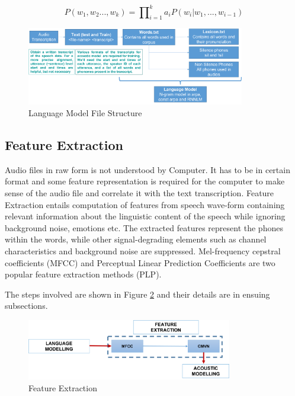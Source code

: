 \documentclass[a4paper, 11pt]{article}
\begin{document}

\begin{equation}
P(w_{1},w_{2}...,w_{k}) = \prod\nolimits_{i = 1}^{k} a_{i} P(w_{i} | w_{1},...,w_{i-1})
\end{equation}

\begin{figure}[h]
    \centering
    \includegraphics[width=0.85\textwidth]{img/LM.png}
    \caption{Language Model File Structure}
    \label{fig:lang-model1}
\end{figure}

\subsection{Feature Extraction}
\label{sec:feature-extraction}
Audio files in raw form is not understood by Computer. It has to be in certain format and some feature representation is required for the computer to make sense of the audio file and correlate it with the text transcription. Feature Extraction entails computation of features from speech wave-form containing relevant information about the linguistic content of the speech while ignoring background noise, emotions etc. The extracted features represent the phones within the words, while other signal-degrading elements such as channel characteristics and background noise are suppressed. Mel-frequency cepstral coefficients (MFCC) and Perceptual Linear Prediction Coefficients are two popular feature extraction methods (PLP). %

The steps involved are shown in Figure \ref{fig:working_pipeline-3} and their details are in ensuing subsections.

\begin{figure}[h]
    \centering
    \includegraphics[width=0.8\textwidth]{img/workflow-3.png}
    \caption{Feature Extraction}
    \label{fig:working_pipeline-3}
\end{figure}
\end{document}
